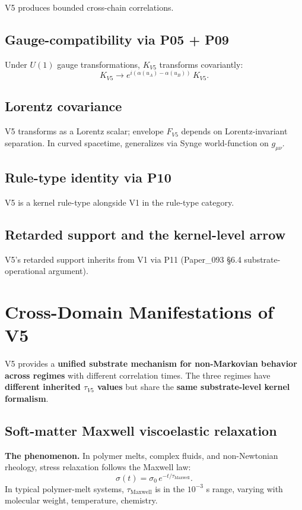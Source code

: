 \documentclass[11pt,a4paper]{article}
\begin{document}
V5 produces bounded cross-chain correlations.

\subsection{Gauge-compatibility via P05 + P09}

Under $U(1)$ gauge transformations, $K_{V5}$ transforms covariantly:
\[
K_{V5} \to e^{i(\alpha(u_A) - \alpha(u_B))}\,K_{V5}.
\]

\subsection{Lorentz covariance}

V5 transforms as a Lorentz scalar; envelope $F_{V5}$ depends on Lorentz-invariant separation. In curved spacetime, generalizes via Synge world-function on $g_{\mu\nu}$.

\subsection{Rule-type identity via P10}

V5 is a kernel rule-type alongside V1 in the rule-type category.

\subsection{Retarded support and the kernel-level arrow}

V5's retarded support inherits from V1 via P11 (Paper\_093 \S6.4 substrate-operational argument).

\section{Cross-Domain Manifestations of V5}

V5 provides a \textbf{unified substrate mechanism for non-Markovian behavior across regimes} with different correlation times. The three regimes have \textbf{different inherited $\tau_{V5}$ values} but share the \textbf{same substrate-level kernel formalism}.

\subsection{Soft-matter Maxwell viscoelastic relaxation}

\textbf{The phenomenon.} In polymer melts, complex fluids, and non-Newtonian rheology, stress relaxation follows the Maxwell law:
\[
\sigma(t) = \sigma_0\,e^{-t/\tau_\mathrm{Maxwell}}.
\]
In typical polymer-melt systems, $\tau_\mathrm{Maxwell}$ is in the $10^{-3}$ s range, varying with molecular weight, temperature, chemistry.
\end{document}
